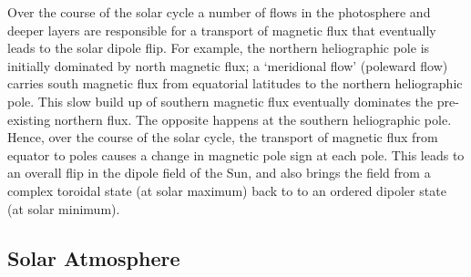 {\color{blue} Over the course of the solar cycle a number of flows in the photosphere and deeper layers are responsible
for a transport of magnetic flux that eventually leads to the solar dipole flip. For example, the northern heliographic pole is initially dominated by north magnetic flux; a `meridional flow' (poleward flow) carries south magnetic flux from equatorial 
latitudes to the northern heliographic pole. This slow build up of southern magnetic flux eventually dominates 
the pre-existing northern flux. The opposite happens at the southern heliographic pole. Hence, over the 
course of the solar cycle, the transport of magnetic flux from equator to poles causes a change in magnetic pole sign at 
each pole. This leads to an overall flip in the dipole field of the Sun, and also brings the field from a complex toroidal state (at solar maximum) back to to an ordered dipoler state (at solar minimum).}






\subsection{Solar Atmosphere}\label{sec:12}

